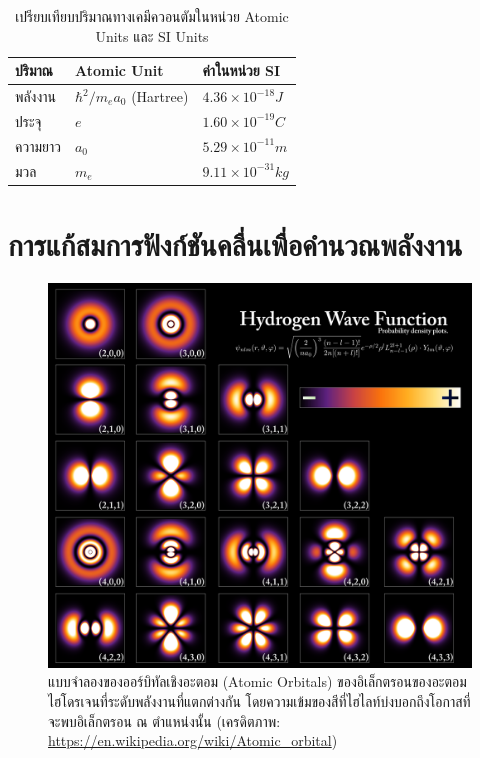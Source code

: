 \begin{table}[H]
    \centering
    \caption{เปรียบเทียบปริมาณทางเคมีควอนตัมในหน่วย Atomic Units และ SI Units}
    \label{tab:atomic_units}
    \small
    \begin{tabular}{lll}\toprule
    ปริมาณ &Atomic Unit &ค่าในหน่วย SI \\\midrule
    พลังงาน & $\hbar^{2}/m_{e}a_{0}$ (Hartree) & $4.36 \times 10^{-18} J$ \\
    ประจุ & $e$ & $1.60 \times 10^{-19} C$ \\
    ความยาว & $a_{0}$ & $5.29 \times 10^{-11} m$ \\
    มวล & $m_{e}$ & $9.11 \times 10^{-31} kg$ \\
    \bottomrule
    \end{tabular}
\end{table}

\section{การแก้สมการฟังก์ชันคลื่นเพื่อคำนวณพลังงาน}
\label{sec:wavefunc_ener}

\begin{figure}[H]
    \centering
    \includegraphics[width=0.8\linewidth]{fig/hydrogen_density_plots.png}
    \caption{แบบจำลองของออร์บิทัลเชิงอะตอม (Atomic Orbitals) ของอิเล็กตรอนของอะตอมไฮโดรเจนที่ระดับพลังงานที่แตกต่างกัน
    โดยความเข้มของสีที่ไฮไลท์บ่งบอกถึงโอกาสที่จะพบอิเล็กตรอน ณ ตำแหน่งนั้น 
    (เครดิตภาพ: \url{https://en.wikipedia.org/wiki/Atomic_orbital})}
    \label{fig:hydrogen_density}
\end{figure}

